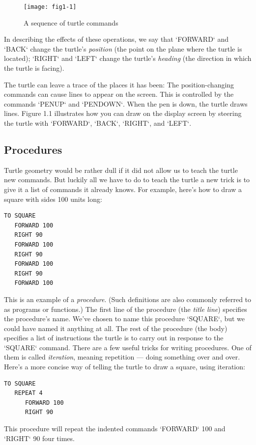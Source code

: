 \documentclass{book}
\begin{document}
\begin{figure}
\begin{center}
\texttt{[image: fig1-1]}
\caption{A sequence of turtle commands}
\end{center}
\end{figure}

In describing the effects of these operations, we say that \textsc{`FORWARD`} and \textsc{`BACK`} change the turtle's {\em position} (the point on the plane where the turtle is located); \textsc{`RIGHT`} and \textsc{`LEFT`} change the turtle's {\em heading} (the direction in which the turtle is facing). 

The turtle can leave a trace of the places it has been: The position-changing commands can cause lines to appear on the screen. This is controlled by the commands \textsc{`PENUP`} and \textsc{`PENDOWN`}. When the pen is down, the turtle draws lines. Figure 1.1 illustrates how you can draw on the display screen by steering the turtle with \textsc{`FORWARD`}, \textsc{`BACK`}, \textsc{`RIGHT`}, and \textsc{`LEFT`}.

\subsection{Procedures}
Turtle geometry would be rather dull if it did not allow us to teach the
turtle new commands. But luckily all we have to do to teach the turtle a
new trick is to give it a list of commands it already knows. For example,
here's how to draw a square with sides 100 units long:
\begin{verbatim}
TO SQUARE
   FORWARD 100
   RIGHT 90
   FORWARD 100
   RIGHT 90
   FORWARD 100
   RIGHT 90
   FORWARD 100
\end{verbatim}
This is an example of a {\em procedure}. (Such definitions are also commonly referred to as programs or functions.) The first line of the procedure (the {\em title line}) specifies the procedure's name. We've chosen to name this procedure \textsc{`SQUARE`}, but we could have named it anything at all. The rest of the procedure (the body) specifies a list of instructions the turtle is to carry out in response to the \textsc{`SQUARE`} command. There are a few useful tricks for writing procedures. One of them is called {\em iteration}, meaning repetition --- doing something over and over. Here's a more concise way of telling the turtle to draw a square, using iteration:

\begin{verbatim}
TO SQUARE
   REPEAT 4
      FORWARD 100
      RIGHT 90
\end{verbatim}
This procedure will repeat the indented commands \textsc{`FORWARD`} 100 and \textsc{`RIGHT`} 90 four times.
\end{document}
